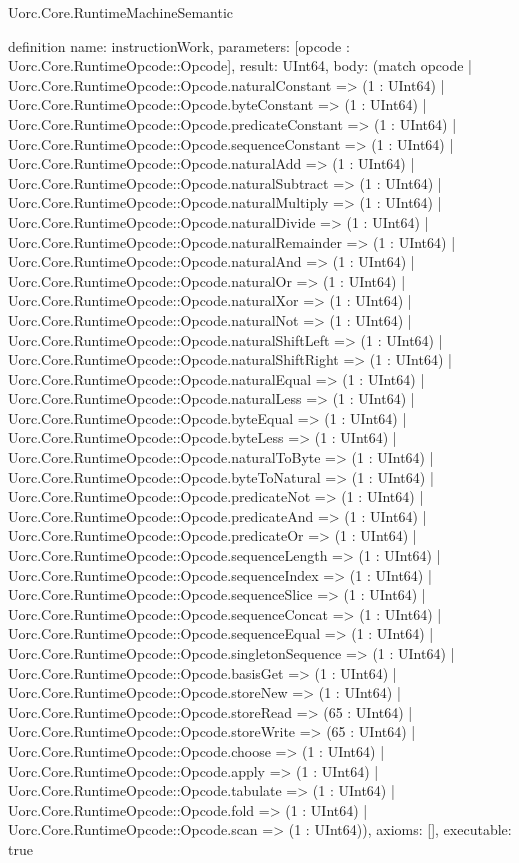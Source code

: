 \begin{lexlean}{Uorc.Core.RuntimeMachineSemantic}
\begin{semanticmodule}
definition{
  name: instructionWork,
  parameters: [opcode : Uorc.Core.RuntimeOpcode::Opcode],
  result: UInt64,
  body: (match opcode
    | Uorc.Core.RuntimeOpcode::Opcode.naturalConstant => (1 : UInt64)
    | Uorc.Core.RuntimeOpcode::Opcode.byteConstant => (1 : UInt64)
    | Uorc.Core.RuntimeOpcode::Opcode.predicateConstant => (1 : UInt64)
    | Uorc.Core.RuntimeOpcode::Opcode.sequenceConstant => (1 : UInt64)
    | Uorc.Core.RuntimeOpcode::Opcode.naturalAdd => (1 : UInt64)
    | Uorc.Core.RuntimeOpcode::Opcode.naturalSubtract => (1 : UInt64)
    | Uorc.Core.RuntimeOpcode::Opcode.naturalMultiply => (1 : UInt64)
    | Uorc.Core.RuntimeOpcode::Opcode.naturalDivide => (1 : UInt64)
    | Uorc.Core.RuntimeOpcode::Opcode.naturalRemainder => (1 : UInt64)
    | Uorc.Core.RuntimeOpcode::Opcode.naturalAnd => (1 : UInt64)
    | Uorc.Core.RuntimeOpcode::Opcode.naturalOr => (1 : UInt64)
    | Uorc.Core.RuntimeOpcode::Opcode.naturalXor => (1 : UInt64)
    | Uorc.Core.RuntimeOpcode::Opcode.naturalNot => (1 : UInt64)
    | Uorc.Core.RuntimeOpcode::Opcode.naturalShiftLeft => (1 : UInt64)
    | Uorc.Core.RuntimeOpcode::Opcode.naturalShiftRight => (1 : UInt64)
    | Uorc.Core.RuntimeOpcode::Opcode.naturalEqual => (1 : UInt64)
    | Uorc.Core.RuntimeOpcode::Opcode.naturalLess => (1 : UInt64)
    | Uorc.Core.RuntimeOpcode::Opcode.byteEqual => (1 : UInt64)
    | Uorc.Core.RuntimeOpcode::Opcode.byteLess => (1 : UInt64)
    | Uorc.Core.RuntimeOpcode::Opcode.naturalToByte => (1 : UInt64)
    | Uorc.Core.RuntimeOpcode::Opcode.byteToNatural => (1 : UInt64)
    | Uorc.Core.RuntimeOpcode::Opcode.predicateNot => (1 : UInt64)
    | Uorc.Core.RuntimeOpcode::Opcode.predicateAnd => (1 : UInt64)
    | Uorc.Core.RuntimeOpcode::Opcode.predicateOr => (1 : UInt64)
    | Uorc.Core.RuntimeOpcode::Opcode.sequenceLength => (1 : UInt64)
    | Uorc.Core.RuntimeOpcode::Opcode.sequenceIndex => (1 : UInt64)
    | Uorc.Core.RuntimeOpcode::Opcode.sequenceSlice => (1 : UInt64)
    | Uorc.Core.RuntimeOpcode::Opcode.sequenceConcat => (1 : UInt64)
    | Uorc.Core.RuntimeOpcode::Opcode.sequenceEqual => (1 : UInt64)
    | Uorc.Core.RuntimeOpcode::Opcode.singletonSequence => (1 : UInt64)
    | Uorc.Core.RuntimeOpcode::Opcode.basisGet => (1 : UInt64)
    | Uorc.Core.RuntimeOpcode::Opcode.storeNew => (1 : UInt64)
    | Uorc.Core.RuntimeOpcode::Opcode.storeRead => (65 : UInt64)
    | Uorc.Core.RuntimeOpcode::Opcode.storeWrite => (65 : UInt64)
    | Uorc.Core.RuntimeOpcode::Opcode.choose => (1 : UInt64)
    | Uorc.Core.RuntimeOpcode::Opcode.apply => (1 : UInt64)
    | Uorc.Core.RuntimeOpcode::Opcode.tabulate => (1 : UInt64)
    | Uorc.Core.RuntimeOpcode::Opcode.fold => (1 : UInt64)
    | Uorc.Core.RuntimeOpcode::Opcode.scan => (1 : UInt64)),
  axioms: [],
  executable: true
}


\end{semanticmodule}
\end{lexlean}
